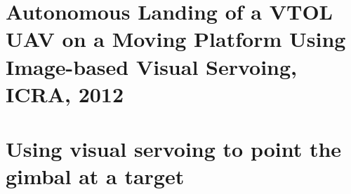 \section{Autonomous Landing of a VTOL UAV on a Moving Platform Using Image-based Visual Servoing, ICRA, 2012}




\section{Using visual servoing to point the gimbal at a target}


%
%
%
%

